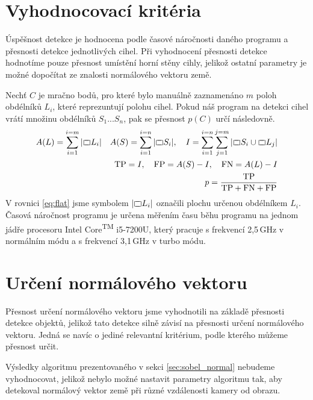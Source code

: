 \documentclass[twoside]{ctuthesis}
\newcommand{\rectangle}{{%
  \ooalign{$\sqsubset\mkern3mu$\cr$\mkern3mu\sqsupset$\cr}%
}}
\begin{document}
\section{Vyhodnocovací kritéria}
Úspěšnost detekce je hodnocena podle časové náročnosti daného programu a přesnosti detekce jednotlivých cihel. Při vyhodnocení přesnosti detekce hodnotíme pouze přesnost umístění horní stěny cihly, jelikož ostatní parametry je možné dopočítat ze znalosti normálového vektoru země.

Nechť $C$ je mračno bodů, pro které bylo manuálně zaznamenáno 
$m$ poloh  obdélníků $L_i$, které reprezuntují polohu cihel. Pokud náš program na detekci cihel vrátí množinu obdélníků $S_1 ... S_n$, pak se přesnost $p(C)$ určí následovně.
\begin{align}
    A(L) = \sum_{i=1}^{i = m}|\rectangle L_i| \quad A(S) = \sum_{i=1}^{i = n}|\rectangle S_i|, \quad I = \sum_{i = 1}^{i = n} \sum_{j = 1}^{j=m} | \rectangle S_i \cup \rectangle L_j | \label{eq:flat} \\
    \text{TP} = I, \quad \text{FP} = A(S) - I, \quad \text{FN} = A(L) - I \\
    p = \frac{\text{TP}}{\text{TP} + \text{FN} + \text{FP}} \label{eq:accuracy}
\end{align}
V rovnici \ref{eq:flat} jsme symbolem $|\rectangle L_i|$ označili plochu určenou obdélníkem $L_i$.  
Časová náročnost programu je určena měřením času běhu programu na jednom jádře procesoru Intel\textregistered{} Core\textsuperscript{TM} i5-7200U, který pracuje s frekvencí 2,5$\,$GHz v normálním módu a s frekvencí 3,1$\,$GHz v turbo módu.

\section{Určení normálového vektoru}
\label{sec:res_normal}
Přesnost určení normálového vektoru jsme vyhodnotili na základě přesnosti detekce objektů, jelikož tato detekce silně závisí na přesnosti určení normálového vektoru. Jedná se navíc o jediné relevantní kritérium, podle kterého můžeme přesnost určit.

Výsledky algoritmu prezentovaného v sekci \ref{sec:sobel_normal} nebudeme vyhodnocovat, jelikož nebylo možné nastavit parametry algoritmu tak, aby detekoval normálový vektor země při různé vzdálenosti kamery od obrazu.
\end{document}
